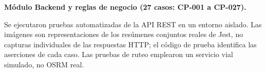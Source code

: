 \par\medskip\noindent\textbf{Módulo Backend y reglas de negocio (27 casos: CP-001 a CP-027).}\par\smallskip
Se ejecutaron pruebas automatizadas de la API REST en un entorno aislado. Las imágenes son representaciones de los resúmenes conjuntos reales de Jest, no capturas individuales de las respuestas HTTP; el código de prueba identifica las aserciones de cada caso. Las pruebas de ruteo emplearon un servicio vial simulado, no OSRM real.


